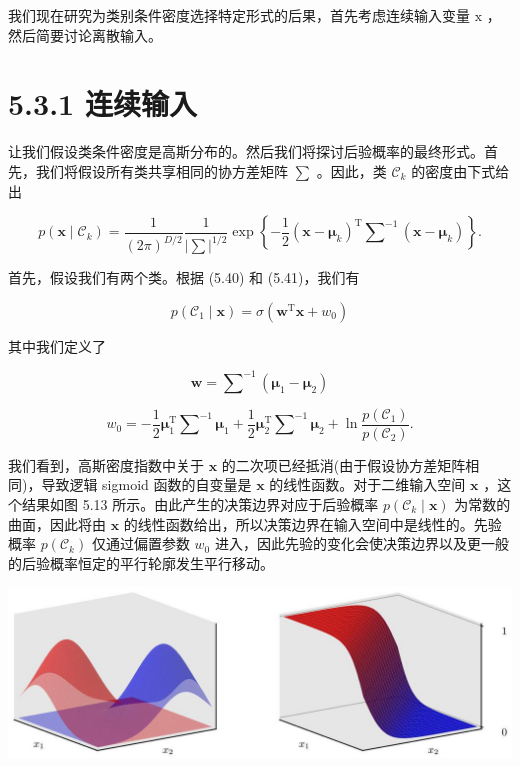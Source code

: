 \documentclass[10pt]{article}
\begin{document}
我们现在研究为类别条件密度选择特定形式的后果，首先考虑连续输入变量 \(\mathrm{x}\) ，然后简要讨论离散输入。

\section*{5.3.1 连续输入}

让我们假设类条件密度是高斯分布的。然后我们将探讨后验概率的最终形式。首先，我们将假设所有类共享相同的协方差矩阵 \(\mathbf{\sum }\) 。因此，类 \({\mathcal{C}}_{k}\) 的密度由下式给出

\[
p\left( {\mathbf{x} \mid  {\mathcal{C}}_{k}}\right)  = \frac{1}{{\left( 2\pi \right) }^{D/2}}\frac{1}{{\left| \mathbf{\sum }\right| }^{1/2}}\exp \left\{  {-\frac{1}{2}{\left( \mathbf{x} - {\mathbf{\mu }}_{k}\right) }^{\mathrm{T}}{\mathbf{\sum }}^{-1}\left( {\mathbf{x} - {\mathbf{\mu }}_{k}}\right) }\right\}  . \tag{5.47}
\]

首先，假设我们有两个类。根据 (5.40) 和 (5.41)，我们有

\[
p\left( {{\mathcal{C}}_{1} \mid  \mathbf{x}}\right)  = \sigma \left( {{\mathbf{w}}^{\mathrm{T}}\mathbf{x} + {w}_{0}}\right)  \tag{5.48}
\]

其中我们定义了

\[
\mathbf{w} = {\mathbf{\sum }}^{-1}\left( {{\mathbf{\mu }}_{1} - {\mathbf{\mu }}_{2}}\right)  \tag{5.49}
\]

\[
{w}_{0} =  - \frac{1}{2}{\mathbf{\mu }}_{1}^{\mathrm{T}}{\mathbf{\sum }}^{-1}{\mathbf{\mu }}_{1} + \frac{1}{2}{\mathbf{\mu }}_{2}^{\mathrm{T}}{\mathbf{\sum }}^{-1}{\mathbf{\mu }}_{2} + \ln \frac{p\left( {\mathcal{C}}_{1}\right) }{p\left( {\mathcal{C}}_{2}\right) }. \tag{5.50}
\]

我们看到，高斯密度指数中关于 \(\mathbf{x}\) 的二次项已经抵消(由于假设协方差矩阵相同)，导致逻辑 sigmoid 函数的自变量是 \(\mathbf{x}\) 的线性函数。对于二维输入空间 \(\mathbf{x}\) ，这个结果如图 5.13 所示。由此产生的决策边界对应于后验概率 \(p\left( {{\mathcal{C}}_{k} \mid  \mathbf{x}}\right)\) 为常数的曲面，因此将由 \(\mathbf{x}\) 的线性函数给出，所以决策边界在输入空间中是线性的。先验概率 \(p\left( {\mathcal{C}}_{k}\right)\) 仅通过偏置参数 \({w}_{0}\) 进入，因此先验的变化会使决策边界以及更一般的后验概率恒定的平行轮廓发生平行移动。

\begin{center}
\includegraphics[max width=1.0\textwidth]{images/0194e279-9b28-703a-88f4-c3ac21e2010d_172_244_352_1309_443_0.jpg}
\end{center}
\hspace*{3em} 
\end{document}
